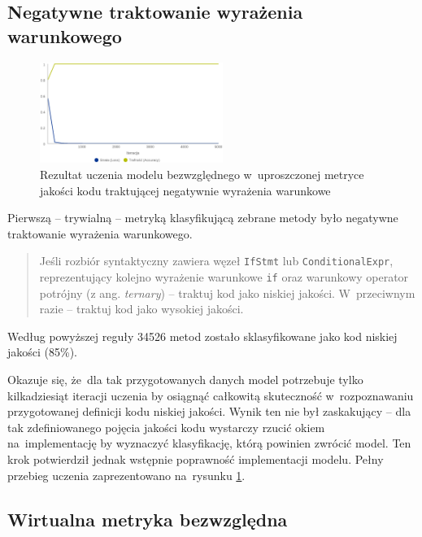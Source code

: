 \documentclass[twoside]{praca}
\begin{document}
\subsection{Negatywne traktowanie wyrażenia warunkowego}


\begin{figure}
\centering
\includegraphics[width=0.53\textwidth]{learn/fake-ifs.eps}
\caption{Rezultat uczenia modelu bezwzględnego w~uproszczonej metryce jakości kodu traktującej negatywnie wyrażenia warunkowe}
\label{fig:learn:fake-ifs}
\end{figure}

Pierwszą -- trywialną -- metryką klasyfikującą zebrane metody było negatywne traktowanie wyrażenia warunkowego.

\begin{quotation}
\noindent Jeśli rozbiór syntaktyczny zawiera węzeł \texttt{IfStmt} lub \texttt{ConditionalExpr}, reprezentujący kolejno wyrażenie warunkowe \texttt{if} oraz warunkowy operator potrójny (z ang. \textit{ternary}) -- traktuj kod jako niskiej jakości. W~przeciwnym razie -- traktuj kod jako wysokiej jakości.
\end{quotation}

Według powyższej reguły 34526 metod zostało sklasyfikowane jako kod niskiej jakości (85\%).

Okazuje się, że~dla tak przygotowanych danych model potrzebuje tylko kilkadziesiąt iteracji uczenia by osiągnąć całkowitą skuteczność w~rozpoznawaniu przygotowanej definicji kodu niskiej jakości. Wynik ten nie był zaskakujący -- dla tak zdefiniowanego pojęcia jakości kodu wystarczy rzucić okiem na~implementację by wyznaczyć klasyfikację, którą powinien zwrócić model. Ten krok potwierdził jednak wstępnie poprawność implementacji modelu. Pełny przebieg uczenia zaprezentowano na~rysunku \ref{fig:learn:fake-ifs}.

\subsection{Wirtualna metryka bezwzględna}
\label{sec:learn:fake-static7}
\end{document}
